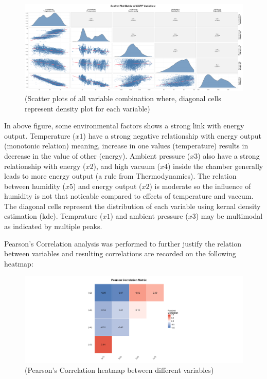 \documentclass[12pt,a4paper]{article}
\begin{document}
\begin{figure}[H]
  \centering
  \includegraphics[width=\textwidth]{z10.png}
  \caption{(Scatter plots of all variable combination where, diagonal cells represent density plot for each variable)}
  \label{fig:Scatter Plot}
\end{figure}

In above figure, some environmental factors shows a strong link with 
energy output. Temperature ($x1$) have a strong 
negative relationship with energy output (monotonic relation) meaning, increase in one values (temperature) results in decrease in the value of other (energy). 
Ambient pressure ($x3$) also have a strong relationship with energy ($x2$), and high vacuum ($x4$) inside the chamber generally leads to 
more energy output (a rule from Thermodynamics). The relation between humidity ($x5$) and energy output ($x2$) is moderate so the 
influence of humidity is not that noticable compared to effects of temperature and vaccum.
The diagonal cells represent the distribution of each variable using kernal density estimation (kde). Temprature ($x1$) and ambient pressure ($x3$)
may be multimodal as indicated by multiple peaks. 

Pearson's Correlation analysis was performed to further justify the relation between 
variables and resulting correlations are recorded on the following heatmap:

\begin{figure}[H]
  \centering
  \includegraphics[width=\textwidth]{z11.png}
  \caption{(Pearson's Correlation heatmap between different variables)}
  \label{fig:Pearson Correlation Matrix}
\end{figure}
\end{document}
